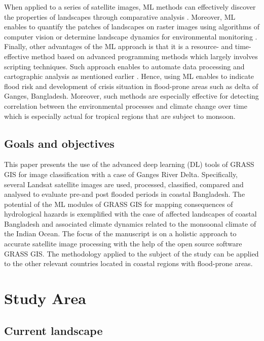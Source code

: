 \documentclass[water,article,submit,pdftex,moreauthors]{Definitions/mdpi}
\begin{document}
When applied to a series of satellite images, ML methods can effectively discover the properties of landscapes through comparative analysis \cite{9324433,Lemenkova202313}. Moreover, ML enables to quantify the patches of landscapes on raster images using algorithms of computer vision  \cite{10281789,jmse11040871,8899013,Lemenkova202021,9333522} or determine landscape dynamics for environmental monitoring \cite{9392684,Lemenkova202324}. Finally, other advantages of the ML approach is that it is a resource- and time-effective method based on advanced programming methods which largely involves scripting techniques. Such approach enables to automate data processing and cartographic analysis as mentioned earlier \cite{10282693,Lemenkova202301,10441504}. Hence, using ML enables to indicate flood risk and development of crisis situation in flood-prone areas such as delta of Ganges, Bangladesh. Moreover, such methods are especially effective for detecting correlation between the environmental processes and climate change over time which is especially actual for tropical regions that are subject to monsoon. 

\subsection{Goals and objectives}

This paper presents the use of the advanced deep learning (DL) tools of GRASS GIS for image classification with a case of Ganges River Delta. Specifically, several Landsat satellite images are used, processed, classified, compared and analysed to evaluate pre-and post flooded periods in coastal Bangladesh. The potential of the ML modules of GRASS GIS for mapping consequences of hydrological hazards is exemplified with the case of affected landscapes of coastal Bangladesh and associated climate dynamics related to the monsoonal climate of the Indian Ocean. The focus of the manuscript is on a holistic approach to accurate satellite image processing with the help of the open source software GRASS GIS. The methodology applied to the subject of the study can be applied to the other relevant countries located in coastal regions with flood-prone areas.

\section{Study Area}

\subsection{Current landscape}
\end{document}
